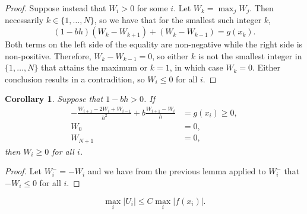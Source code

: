 \documentclass{article}
\theoremstyle{plain}
\newtheorem{corollary}{Corollary}
\begin{document}
\begin{proof}
	Suppose instead that $W_i > 0$ for some $i$.
	Let $W_k = \max_j W_j$.
	Then necessarily $k \in \{1,\dots,N\}$, so we have that for the smallest such integer $k$,
	\[(1-bh)(W_k-W_{k+1}) + (W_k-W_{k-1}) = g(x_k).\]
	Both terms on the left side of the equality are non-negative while the right side is non-positive.
	Therefore, $W_k - W_{k-1} = 0$, so either $k$ is not the smallest integer in $\{1,\dots,N\}$ that attains the maximum or $k = 1$, in which case $W_k = 0$.
	Either conclusion results in a contradition, so $W_i \leq 0$ for all $i$.
\end{proof}
\begin{corollary}\label{corollary1}
	Suppose that $1-bh > 0$.
	If
	\begin{align*}
		-\frac{W_{i+1}-2W_i+W_{i-1}}{h^2} + b\frac{W_{i+1}-W_i}{h} & = g(x_i) \geq 0, \\
		W_0                                                        & = 0,             \\
		W_{N+1}                                                    & = 0,
	\end{align*}
	then $W_i \geq 0$ for all $i$.
\end{corollary}
\begin{proof}
	Let $W_i^- = -W_i$ and we have from the previous lemma applied to $W_i^-$ that $-W_i \leq 0$ for all $i$.
\end{proof}
\[\max_i|U_i| \leq C\max_i|f(x_i)|.\]
\end{document}
